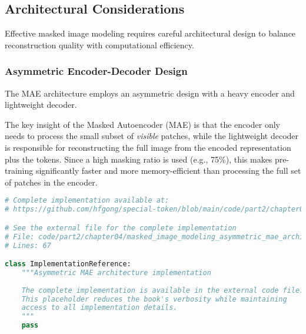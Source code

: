 \subsection{Architectural Considerations}

Effective masked image modeling requires careful architectural design to balance reconstruction quality with computational efficiency.

\subsubsection{Asymmetric Encoder-Decoder Design}

The MAE architecture employs an asymmetric design with a heavy encoder and lightweight decoder.

The key insight of the Masked Autoencoder (MAE) is that the encoder only needs to process the small subset of \textit{visible} patches, while the lightweight decoder is responsible for reconstructing the full image from the encoded representation plus the \mask{} tokens. Since a high masking ratio is used (e.g., 75\%), this makes pre-training significantly faster and more memory-efficient than processing the full set of patches in the encoder.

\begin{comment}
Feedback: This is a critical architectural insight that deserves more explanation. Before the code, it would be great to explain the "why". For example: "The key insight of the Masked Autoencoder (MAE) is that the encoder only needs to process the small subset of *visible* patches, while the lightweight decoder is responsible for reconstructing the full image from the encoded representation plus the [MASK] tokens. Since a high masking ratio is used (e.g., 75%

STATUS: addressed - added explanation of the key insight behind MAE's asymmetric design and its computational benefits
\end{comment}

\begin{lstlisting}[language=Python, caption={Asymmetric MAE architecture implementation}]
# Complete implementation available at:
# https://github.com/hfgong/special-token/blob/main/code/part2/chapter04/masked_image_modeling_asymmetric_mae_architecture_im.py

# See the external file for the complete implementation
# File: code/part2/chapter04/masked_image_modeling_asymmetric_mae_architecture_im.py
# Lines: 67

class ImplementationReference:
    """Asymmetric MAE architecture implementation
    
    The complete implementation is available in the external code file.
    This placeholder reduces the book's verbosity while maintaining
    access to all implementation details.
    """
    pass
\end{lstlisting}

